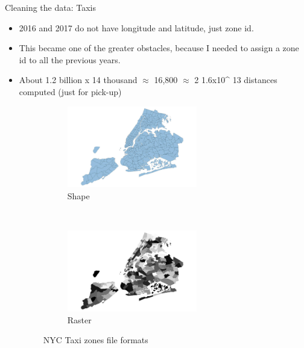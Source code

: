 \documentclass[10pt,ignorenonframetext,]{beamer}
\providecommand{\tightlist}{%
  \setlength{\itemsep}{0pt}\setlength{\parskip}{0pt}}
\begin{document}
\begin{frame}

\begin{block}{Cleaning the data: Taxis}

\begin{itemize}
\tightlist
\item
  2016 and 2017 do not have longitude and latitude, just zone id.
\item
  This became one of the greater obstacles, because I needed to assign a
  zone id to all the previous years.
\item
  About 1.2 billion x 14 thousand \(\approx\) 16,800 \(\approx\) 2
  1.6x10\^{} 13 distances computed (just for pick-up)

  \begin{figure}
    \label{fig:zones}
  \centering
  \begin{subfigure}[t]{0.45\textwidth}
      \centering
      \label{fig:zones_shape}
      \includegraphics[height=1.4in]{../latex/images/taxi_zones_shape}
      \caption{Shape}
  \end{subfigure}%
  ~ 
  \begin{subfigure}[t]{0.45\textwidth}
      \centering
      \label{fig:zones_raster}
      \includegraphics[height=1.4in]{../latex/images/taxi_zones_raster}
      \caption{Raster}
  \end{subfigure}
  \caption{NYC Taxi zones file formats}
    \end{figure}
\end{itemize}

\end{block}

\end{frame}
\end{document}
